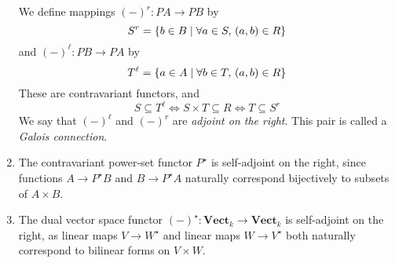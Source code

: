 \begin{example}
\begin{enumerate}
        We define mappings \( (-)^r : PA \to PB \) by
        \[ S^r = \qty{b \in B \mid \forall a \in S,\, (a, b) \in R} \]
        and \( (-)^\ell : PB \to PA \) by
        \[ T^\ell = \qty{a \in A \mid \forall b \in T,\, (a, b) \in R} \]
        These are contravariant functors, and
        \[ S \subseteq T^\ell \iff S \times T \subseteq R \iff T \subseteq S^r \]
        We say that \( (-)^\ell \) and \( (-)^r \) are \emph{adjoint on the right}.
        This pair is called a \emph{Galois connection}.
        \item The contravariant power-set functor \( P^\star \) is self-adjoint on the right, since functions \( A \to P^\star B \) and \( B \to P^\star A \) naturally correspond bijectively to subsets of \( A \times B \).
        \item The dual vector space functor \( (-)^\star : \mathbf{Vect}_k \to \mathbf{Vect}_k \) is self-adjoint on the right, as linear maps \( V \to W^\star \) and linear maps \( W \to V^\star \) both naturally correspond to bilinear forms on \( V \times W \).
    \end{enumerate}
\end{example}

